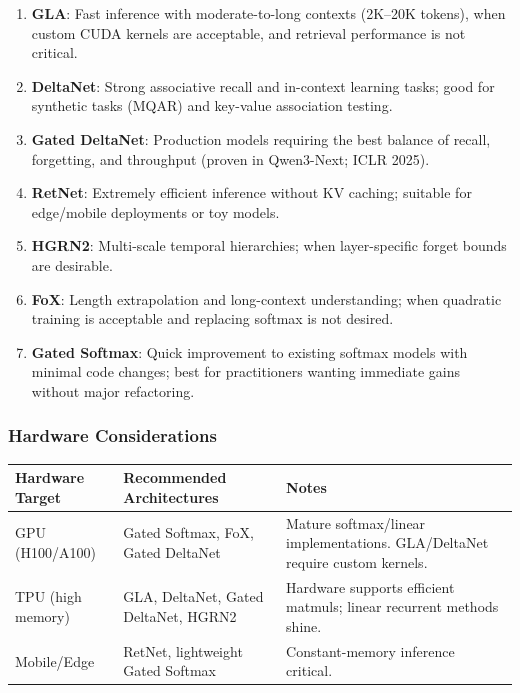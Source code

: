 \documentclass[11pt,a4paper]{article}
\begin{document}
\begin{enumerate}[leftmargin=*]
    \item \textbf{GLA}: Fast inference with moderate-to-long contexts (2K--20K tokens), when custom CUDA kernels are acceptable, and retrieval performance is not critical.
    \item \textbf{DeltaNet}: Strong associative recall and in-context learning tasks; good for synthetic tasks (MQAR) and key-value association testing.
    \item \textbf{Gated DeltaNet}: Production models requiring the best balance of recall, forgetting, and throughput (proven in Qwen3-Next; ICLR 2025).
    \item \textbf{RetNet}: Extremely efficient inference without KV caching; suitable for edge/mobile deployments or toy models.
    \item \textbf{HGRN2}: Multi-scale temporal hierarchies; when layer-specific forget bounds are desirable.
    \item \textbf{FoX}: Length extrapolation and long-context understanding; when quadratic training is acceptable and replacing softmax is not desired.
    \item \textbf{Gated Softmax}: Quick improvement to existing softmax models with minimal code changes; best for practitioners wanting immediate gains without major refactoring.
\end{enumerate}

\subsubsection{Hardware Considerations}

\begin{table}[H]
\centering
\small
\begin{tabularx}{0.95\linewidth}{Xp{3.5cm}p{3.5cm}}
\toprule
\textbf{Hardware Target} & \textbf{Recommended Architectures} & \textbf{Notes} \\
\midrule
GPU (H100/A100) & Gated Softmax, FoX, Gated DeltaNet & Mature softmax/linear implementations. GLA/DeltaNet require custom kernels. \\
TPU (high memory) & GLA, DeltaNet, Gated DeltaNet, HGRN2 & Hardware supports efficient matmuls; linear recurrent methods shine. \\
Mobile/Edge & RetNet, lightweight Gated Softmax & Constant-memory inference critical. \\
\bottomrule
\end{tabularx}
\end{table}
\end{document}
